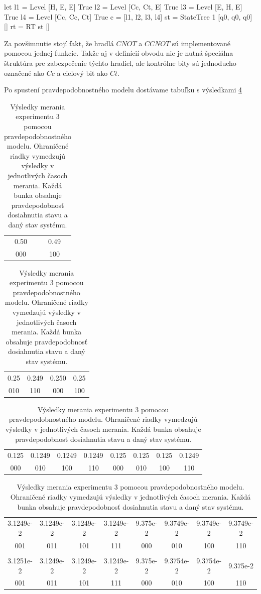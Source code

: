 \begin{code}
let l1 = Level [H, E, E] True
    l2 = Level [Cc, Ct, E] True
    l3 = Level [E, H, E] True
    l4 = Level [Cc, Cc, Ct] True
    c = [l1, l2, l3, l4]
    st = StateTree 1 [q0, q0, q0] []
    rt = RT st []
\end{code}

Za povšimnutie stojí fakt, že hradlá \(CNOT\) a \(CCNOT\) sú implementované
pomocou jednej funkcie. Takže aj v definícií obvodu nie je nutná špeciálna 
štruktúra pre zabezpečenie týchto hradiel, ale kontrólne bity sú jednoducho
označené ako \(Cc\) a cieľový bit ako \(Ct\).

Po spustení pravdepodobnostného modelu dostávame tabuľku s výsledkami 
\ref{expr3_results}

\begin{table}
\centering

\begin{tabular}{|c|c|}
\hline
0.50 & 0.49 \\ 
000 & 100 \\ 
\hline
\end{tabular}

\begin{tabular}{|c|c|c|c|}
\hline
0.25 & 0.249 & 0.250 & 0.25 \\ 
010 & 110 & 000 & 100 \\ 
\hline
\end{tabular}

\begin{tabular}{|c|c|c|c|c|c|c|c|}
\hline
0.125 & 0.1249 & 0.1249 & 0.1249 & 0.125 & 0.125 & 0.125 & 0.1249 \\ 
000 & 010 & 100 & 110 & 000 & 010 & 100 & 110 \\ 
\hline
\end{tabular}

\begin{tabular}{|c|c|c|c|c|c|c|c|}
\hline
3.1249e-2 & 3.1249e-2 & 3.1249e-2 & 3.1249e-2 & 9.375e-2 & 9.3749e-2 & 9.3749e-2 & 9.3749e-2  \\ 
001 & 011 & 101 & 111 & 000 & 010 & 100 & 110  \\ 

& & & & & & & \\

3.1251e-2 & 3.1249e-2 & 3.1249e-2 & 3.1249e-2 & 9.375e-2 & 9.3754e-2 & 9.3754e-2 & 9.375e-2 \\
001 & 011 & 101 & 111 & 000 & 010 & 100 & 110 \\
\hline
\end{tabular}

\caption{\label{expr3_results} Výsledky merania experimentu 3 pomocou
pravdepodobnostného modelu. Ohraničené riadky vymedzujú výsledky v jednotlivých
 časoch merania. Každá bunka obsahuje pravdepodobnosť dosiahnutia stavu a 
daný stav systému.}
\end{table}

